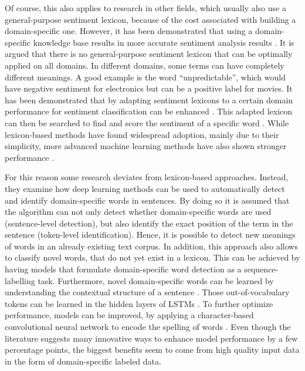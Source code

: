 \documentclass[11pt, a4paper]{article}
\begin{document}
Of course, this also applies to research in other fields, which usually also use a general-purpose sentiment lexicon, 
because of the cost associated with building a domain-specific one. However, it has been demonstrated that using a domain-specific 
knowledge base results in more accurate sentiment analysis results \citep{park2015EfficientExtraction}.
It is argued that there is no general-purpose sentiment lexicon that can be optimally applied on all domains. 
In different domains, some terms can have completely different meanings. A good example is the word “unpredictable”, 
which would have negative sentiment for electronics but can be a positive label for movies. It has been demonstrated 
that by adapting sentiment lexicons to a certain domain performance for sentiment classification can be enhanced 
\citep{Lu2011automaticconstruction}. This adapted lexicon can then be searched to find and score the sentiment 
of a specific word \citep{ashgar2014DetectionSlang}. 
While lexicon-based methods have found widespread adoption, mainly due to their simplicity, more advanced machine 
learning methods have also shown stronger performance \citep{wang2020automaticconstructiondomainsentiment}.

For this reason some research deviates from lexicon-based approaches. Instead, they examine how deep learning methods can be 
used to automatically detect and identify domain-specific words in sentences. By doing so it is assumed that the 
algorithm can not only detect whether domain-specific words are used (sentence-level detection), but also identify 
the exact position of the term in the sentence (token-level identification). Hence, it is possible to detect new meanings 
of words in an already existing text corpus. In addition, this approach also allows to classify novel words, that do not yet 
exist in a lexicon. This can be achieved by having models that formulate domain-specific word detection as a 
sequence-labelling task. Furthermore, novel domain-specific words can be learned by understanding the contextual 
structure of a sentence \citep{pei2019slang}. Those out-of-vocabulary tokens can be learned in the hidden layers of 
LSTMs \citep{hochreiter1997lstm}. To further optimize performance, models can be improved, by applying a character-based 
convolutional neural network to encode the spelling of words \citep{pei2019slang}. Even though the literature suggests many 
innovative ways to enhance model performance by a few percentage points, the biggest benefits seem to come from high quality 
input data in the form of domain-specific labeled data.
\end{document}
